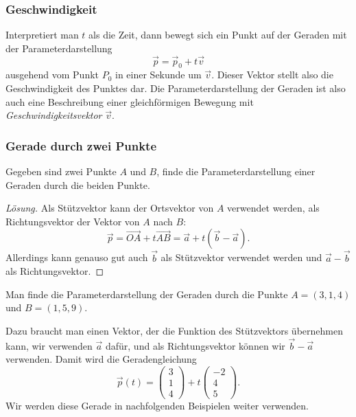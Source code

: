 \subsubsection{Geschwindigkeit}
Interpretiert man $t$ als die Zeit, dann bewegt sich ein Punkt auf der
Geraden mit der Parameterdarstellung
\[
\vec{p} = \vec{p}_0 + t \vec{v}
\]
ausgehend vom Punkt $P_0$ in einer Sekunde um $\vec v$.
Dieser Vektor stellt also die Geschwindigkeit des Punktes dar.
Die Parameterdarstellung der Geraden ist also auch eine
Beschreibung einer gleichförmigen Bewegung mit {\em Geschwindigkeitsvektor}
$\vec{v}$.

\subsubsection{Gerade durch zwei Punkte}
\begin{aufgabe}
Gegeben sind zwei Punkte $A$ und $B$, finde die Parameterdarstellung einer
Geraden durch die beiden Punkte.
\end{aufgabe}
\begin{proof}[Lösung]
Als Stützvektor kann der Ortsvektor von $A$ verwendet werden,
als Richtungsvektor der Vektor von $A$ nach $B$:
\[
\vec{p}
=
\overrightarrow{OA} + t\overrightarrow{AB}
=
\vec{a} + t(\vec{b}-\vec{a}).
\]
Allerdings kann genauso gut auch $\vec{b}$ als Stützvektor verwendet
werden und $\vec{a}-\vec{b}$ als Richtungsvektor.
\end{proof}

\begin{beispiel}
Man finde die Parameterdarstellung der Geraden durch die Punkte
$A=(3,1,4)$ und $B=(1,5,9)$.

\smallskip

{\parindent 0pt
Dazu} braucht man einen Vektor, der die Funktion des Stützvektors übernehmen
kann, wir verwenden $\vec{a}$ dafür, und als
Richtungsvektor können wir $\vec{b}-\vec{a}$ verwenden.
Damit wird die Geradengleichung
\begin{equation}
\vec{p}(t) =
\begin{pmatrix}3\\1\\4 \end{pmatrix}
+t
\begin{pmatrix}-2\\4\\5\end{pmatrix}.
\label{pigerade}
\end{equation}
Wir werden diese Gerade in nachfolgenden Beispielen weiter verwenden.
\end{beispiel}


